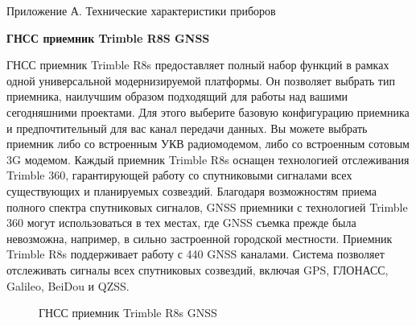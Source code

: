 \documentclass[a4paper]{article}
\begin{document}
\begin{newpage}

    \begin{flushright}
    Приложение А. Технические характеристики приборов
    \end{flushright}
    
    \begin{center}
        \textbf{ГНСС приемник Trimble R8S GNSS}
    \end{center}
    \par ГНСС приемник Trimble R8s предоставляет полный набор функций в рамках одной универсальной модернизируемой платформы. Он позволяет выбрать  тип приемника, наилучшим образом подходящий для работы над вашими сегодняшними проектами. Для этого выберите базовую конфигурацию приемника и  предпочтительный для вас канал передачи данных. Вы можете выбрать приемник либо со встроенным УКВ радиомодемом, либо со встроенным сотовым 3G  модемом. Каждый приемник Trimble R8s оснащен технологией отслеживания  Trimble 360, гарантирующей работу со спутниковыми сигналами всех существующих и планируемых созвездий. Благодаря возможностям приема полного спектра спутниковых сигналов, GNSS приемники с технологией Trimble 360 могут  использоваться в тех местах, где GNSS съемка прежде была невозможна, например, в сильно застроенной городской местности. Приемник Trimble R8s поддерживает работу с 440 GNSS каналами. Система позволяет отслеживать сигналы всех спутниковых созвездий, включая GPS, ГЛОНАСС, Galileo, BeiDou и QZSS.\\

    \begin{figure}[h]
        \caption{ГНСС приемник Trimble R8s GNSS}
        \label{fig:image}
    \end{figure}
    
\end{newpage}
\end{document}
